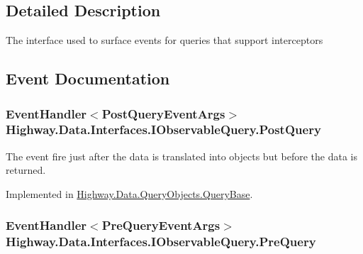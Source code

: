 \subsection{Detailed Description}
The interface used to surface events for queries that support interceptors 



\subsection{Event Documentation}
\hypertarget{interface_highway_1_1_data_1_1_interfaces_1_1_i_observable_query_ac8cff5ce936c3611f965796ba9707c49}{
\subsubsection[{Post\-Query}]{\setlength{\rightskip}{0pt plus 5cm}Event\-Handler$<${\bf Post\-Query\-Event\-Args}$>$ Highway.\-Data.\-Interfaces.\-I\-Observable\-Query.\-Post\-Query}}\label{interface_highway_1_1_data_1_1_interfaces_1_1_i_observable_query_ac8cff5ce936c3611f965796ba9707c49}


The event fire just after the data is translated into objects but before the data is returned. 



Implemented in \hyperlink{class_highway_1_1_data_1_1_query_objects_1_1_query_base_a75da4f1ac849eac015645365f982a9ff}{Highway.\-Data.\-Query\-Objects.\-Query\-Base}.

\hypertarget{interface_highway_1_1_data_1_1_interfaces_1_1_i_observable_query_a1687e8dccf74ef87f98fe8ef6f1c99c3}{
\subsubsection[{Pre\-Query}]{\setlength{\rightskip}{0pt plus 5cm}Event\-Handler$<${\bf Pre\-Query\-Event\-Args}$>$ Highway.\-Data.\-Interfaces.\-I\-Observable\-Query.\-Pre\-Query}}\label{interface_highway_1_1_data_1_1_interfaces_1_1_i_observable_query_a1687e8dccf74ef87f98fe8ef6f1c99c3}


